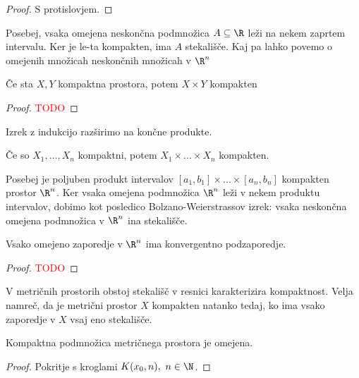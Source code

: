 \begin{proof}
    S protislovjem.
\end{proof}

Posebej, vsaka omejena neskončna podmnožica $A \subseteq \R$ leži na nekem zaprtem intervalu. Ker je le-ta kompakten, ima $A$ stekališče. Kaj pa lahko povemo o omejenih množicah neskončnih množicah v \(\R^n\)

\begin{izrek}
    Če sta $X, Y$ kompaktna prostora, potem $X \times Y$ kompakten
\end{izrek}

\begin{proof}
    \textcolor{red}{TODO}
\end{proof}

Izrek z indukcijo razširimo na končne produkte.
\begin{posledica}
    Če so $X_1, \ldots, X_n$ kompaktni, potem $X_1 \times \ldots \times X_n$ kompakten.
\end{posledica}

\begin{opomba}
    Posebej je poljuben produkt intervalov $[a_1, b_1] \times \ldots \times [a_n,b_n]$ kompakten prostor $\R^n$. Ker vsaka omejena podmnožica $\R^n$ leži v nekem produktu intervalov, dobimo kot posledico Bolzano-Weierstrassov izrek: vsaka neskončna omejena podmnožica v \(\R^n\) ina stekališče.
\end{opomba}

\begin{izrek}
    Vsako omejeno zaporedje v $\R^n$ ima konvergentno podzaporedje.
\end{izrek}

\begin{proof}
    \textcolor{red}{TODO}
\end{proof}

\begin{opomba}
    V metričnih prostorih obstoj stekališč v resnici karakterizira kompaktnost. Velja namreč, da je metrični prostor $X$ kompakten natanko tedaj, ko ima vsako zaporedje v $X$ vsaj eno stekališče.
\end{opomba}

\begin{trditev}
    Kompaktna podmnožica metričnega prostora je omejena.
\end{trditev}

\begin{proof}
    Pokritje s kroglami $K(x_0,n), \ n \in \N$.
\end{proof}

